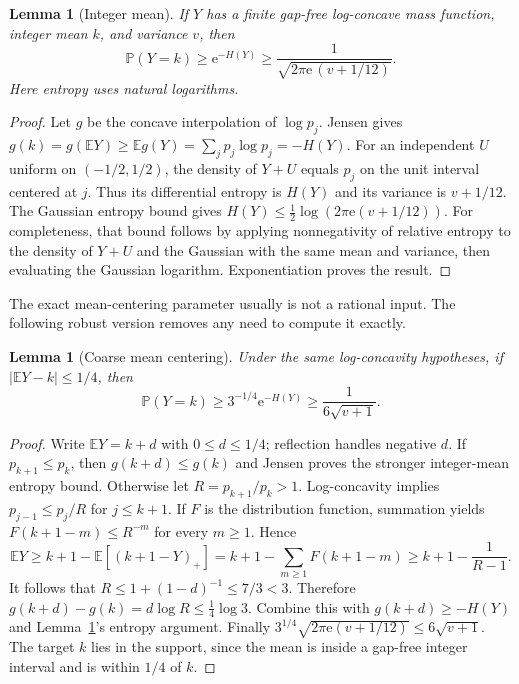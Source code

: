 \documentclass[11pt,a4paper]{article}
\newtheorem{lemma}[theorem]{Lemma}
\theoremstyle{definition}
\newcommand{\E}{\mathbb E}
\newcommand{\Prob}{\mathbb P}
\newcommand{\ee}{\mathrm e}
\newcommand{\abs}[1]{\left|#1\right|}
\begin{document}
\begin{lemma}[Integer mean]\label{lem:integermean}
If $Y$ has a finite gap-free log-concave mass function, integer mean $k$, and variance $v$, then
\begin{equation}\label{eq:centralentropy}
 \Prob(Y=k)\ge\ee^{-H(Y)}\ge
 \frac{1}{\sqrt{2\pi\ee\,(v+1/12)}}.
\end{equation}
Here entropy uses natural logarithms.
\end{lemma}
\begin{proof}
Let $g$ be the concave interpolation of $\log p_j$. Jensen gives
$g(k)=g(\E Y)\ge\E g(Y)=\sum_jp_j\log p_j=-H(Y)$.
For an independent $U$ uniform on $(-1/2,1/2)$, the density of $Y+U$ equals $p_j$ on the unit interval centered at $j$. Thus its differential entropy is $H(Y)$ and its variance is $v+1/12$. The Gaussian entropy bound gives
$H(Y)\le\tfrac12\log(2\pi\ee(v+1/12))$.
For completeness, that bound follows by applying nonnegativity of relative entropy to the density of $Y+U$ and the Gaussian with the same mean and variance, then evaluating the Gaussian logarithm. Exponentiation proves the result.
\end{proof}

The exact mean-centering parameter usually is not a rational input. The following robust version removes any need to compute it exactly.

\begin{lemma}[Coarse mean centering]\label{lem:coarsemean}
Under the same log-concavity hypotheses, if $\abs{\E Y-k}\le1/4$, then
\begin{equation}\label{eq:coarselower}
 \Prob(Y=k)\ge3^{-1/4}\ee^{-H(Y)}
 \ge \frac{1}{6\sqrt{v+1}}.
\end{equation}
\end{lemma}
\begin{proof}
Write $\E Y=k+d$ with $0\le d\le1/4$; reflection handles negative $d$. If $p_{k+1}\le p_k$, then $g(k+d)\le g(k)$ and Jensen proves the stronger integer-mean entropy bound. Otherwise let $R=p_{k+1}/p_k>1$. Log-concavity implies $p_{j-1}\le p_j/R$ for $j\le k+1$. If $F$ is the distribution function, summation yields
$F(k+1-m)\le R^{-m}$ for every $m\ge1$. Hence
\[
 \E Y\ge k+1-\E[(k+1-Y)_+]
 =k+1-\sum_{m\ge1}F(k+1-m)
 \ge k+1-\frac{1}{R-1}.
\]
It follows that $R\le1+(1-d)^{-1}\le7/3<3$. Therefore
$g(k+d)-g(k)=d\log R\le\tfrac14\log3$.
Combine this with $g(k+d)\ge-H(Y)$ and Lemma~\ref{lem:integermean}'s entropy argument. Finally
$3^{1/4}\sqrt{2\pi\ee(v+1/12)}\le6\sqrt{v+1}$.
The target $k$ lies in the support, since the mean is inside a gap-free integer interval and is within $1/4$ of $k$.
\end{proof}
\end{document}
